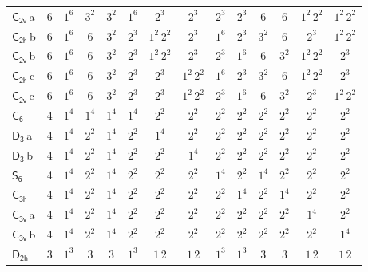 \documentclass[10pt,a4paper]{article}
\numberwithin{equation}{section}
\newcommand{\grp}[1]{\mathsf{#1}}
\newcommand{\clsletter}[1]{\,{\scriptsize\color{black!55}#1}}
\begin{document}
{\begin{longtable}{@{}lrcccccccccccc@{}}
\href{C2v.pdf}{$\grp{C_{2v}}$}\clsletter{a} & 6 & $1^{6}$ & $3^{2}$ & $3^{2}$ & $1^{6}$ & $2^{3}$ & $2^{3}$ & $2^{3}$ & $2^{3}$ & $6$ & $6$ & $1^{2}\,2^{2}$ & $1^{2}\,2^{2}$\\
\href{C2h.pdf}{$\grp{C_{2h}}$}\clsletter{b} & 6 & $1^{6}$ & $6$ & $3^{2}$ & $2^{3}$ & $1^{2}\,2^{2}$ & $2^{3}$ & $1^{6}$ & $2^{3}$ & $3^{2}$ & $6$ & $2^{3}$ & $1^{2}\,2^{2}$\\
\href{C2v.pdf}{$\grp{C_{2v}}$}\clsletter{b} & 6 & $1^{6}$ & $6$ & $3^{2}$ & $2^{3}$ & $1^{2}\,2^{2}$ & $2^{3}$ & $2^{3}$ & $1^{6}$ & $6$ & $3^{2}$ & $1^{2}\,2^{2}$ & $2^{3}$\\
\href{C2h.pdf}{$\grp{C_{2h}}$}\clsletter{c} & 6 & $1^{6}$ & $6$ & $3^{2}$ & $2^{3}$ & $2^{3}$ & $1^{2}\,2^{2}$ & $1^{6}$ & $2^{3}$ & $3^{2}$ & $6$ & $1^{2}\,2^{2}$ & $2^{3}$\\
\href{C2v.pdf}{$\grp{C_{2v}}$}\clsletter{c} & 6 & $1^{6}$ & $6$ & $3^{2}$ & $2^{3}$ & $2^{3}$ & $1^{2}\,2^{2}$ & $2^{3}$ & $1^{6}$ & $6$ & $3^{2}$ & $2^{3}$ & $1^{2}\,2^{2}$\\
\href{C6.pdf}{$\grp{C_{6}}$} & 4 & $1^{4}$ & $1^{4}$ & $1^{4}$ & $1^{4}$ & $2^{2}$ & $2^{2}$ & $2^{2}$ & $2^{2}$ & $2^{2}$ & $2^{2}$ & $2^{2}$ & $2^{2}$\\
\href{D3.pdf}{$\grp{D_{3}}$}\clsletter{a} & 4 & $1^{4}$ & $2^{2}$ & $1^{4}$ & $2^{2}$ & $1^{4}$ & $2^{2}$ & $2^{2}$ & $2^{2}$ & $2^{2}$ & $2^{2}$ & $2^{2}$ & $2^{2}$\\
\href{D3.pdf}{$\grp{D_{3}}$}\clsletter{b} & 4 & $1^{4}$ & $2^{2}$ & $1^{4}$ & $2^{2}$ & $2^{2}$ & $1^{4}$ & $2^{2}$ & $2^{2}$ & $2^{2}$ & $2^{2}$ & $2^{2}$ & $2^{2}$\\
\href{S6.pdf}{$\grp{S_{6}}$} & 4 & $1^{4}$ & $2^{2}$ & $1^{4}$ & $2^{2}$ & $2^{2}$ & $2^{2}$ & $1^{4}$ & $2^{2}$ & $1^{4}$ & $2^{2}$ & $2^{2}$ & $2^{2}$\\
\href{C3h.pdf}{$\grp{C_{3h}}$} & 4 & $1^{4}$ & $2^{2}$ & $1^{4}$ & $2^{2}$ & $2^{2}$ & $2^{2}$ & $2^{2}$ & $1^{4}$ & $2^{2}$ & $1^{4}$ & $2^{2}$ & $2^{2}$\\
\href{C3v.pdf}{$\grp{C_{3v}}$}\clsletter{a} & 4 & $1^{4}$ & $2^{2}$ & $1^{4}$ & $2^{2}$ & $2^{2}$ & $2^{2}$ & $2^{2}$ & $2^{2}$ & $2^{2}$ & $2^{2}$ & $1^{4}$ & $2^{2}$\\
\href{C3v.pdf}{$\grp{C_{3v}}$}\clsletter{b} & 4 & $1^{4}$ & $2^{2}$ & $1^{4}$ & $2^{2}$ & $2^{2}$ & $2^{2}$ & $2^{2}$ & $2^{2}$ & $2^{2}$ & $2^{2}$ & $2^{2}$ & $1^{4}$\\
\href{D2h.pdf}{$\grp{D_{2h}}$} & 3 & $1^{3}$ & $3$ & $3$ & $1^{3}$ & $1\,2$ & $1\,2$ & $1^{3}$ & $1^{3}$ & $3$ & $3$ & $1\,2$ & $1\,2$\\

\end{longtable}}
\end{document}
